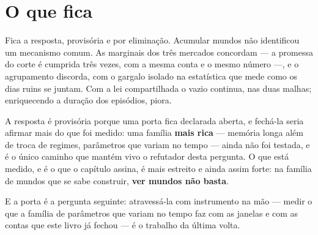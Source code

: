 \section{O que fica}

Fica a resposta, provisória e por eliminação. Acumular mundos não identificou um mecanismo
comum. As marginais dos três mercados concordam --- a promessa do corte é cumprida
três vezes, com a mesma conta e o mesmo número ---, e o agrupamento discorda, com o gargalo
isolado na estatística que mede como os dias ruins se juntam\cite{bing2023invariance}. Com a lei compartilhada o vazio
continua, nas duas malhas; enriquecendo a duração dos episódios, piora.

A resposta é provisória porque uma porta fica declarada aberta, e fechá-la seria afirmar mais do
que foi medido: uma família \textbf{mais rica} --- memória longa além de troca de regimes, parâmetros
que variam no tempo \cite{palma2010efficient,dahlhaus2006nonparametric,palma2013estimation} --- ainda não foi testada, e é o único caminho que mantém vivo o refutador
desta pergunta. O que está medido, e é o que o capítulo assina, é mais estreito e ainda assim
forte: na família de mundos que se sabe construir, \textbf{ver mundos não basta}.

E a porta é a pergunta seguinte: atravessá-la com instrumento na mão --- medir o que a família de
parâmetros que variam no tempo faz com as janelas e com as contas que este livro já fechou --- é
o trabalho da última volta.
